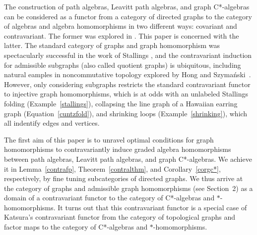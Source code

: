 \documentclass[12pt,times,a4paper]{amsart}
\numberwithin{equation}{section}
\numberwithin{equation}{section}
\begin{document}
The construction of path algebras, Leavitt path algebras, and graph C*-algebras can be considered as a functor from a category of 
directed graphs to the category of algebras and algebra homomorphisms in two different ways: covariant and contravariant. The former was explored in
\cite{kr-g09,j-s02,amp07,ht23}. This paper is concerned with the latter. 
The standard category of graphs and graph homomorphism was spectacularly successful in the work of Stallings \cite{s-jr83}, and the 
contravariant induction for admissible subgraphs (also called  quotient graphs)  is ubiquitous, including natural eamples in
 noncommutative topology explored by Hong and Szyma\'nski~\cite{hs02,hs08}. 
However, only considering subgraphs restricts  the standard contravariant functor to
injective graph homomorphisms, which is at odds with an unlabeled Stallings folding (Example~\ref{stallings}),
collapsing the line graph of a Hawaiian earring graph (Equation~\eqref{cuntzfold}), and
shrinking loops (Example~\ref{shrinking}), which all
indentify edges and vertices.

The first  aim of this paper is to unravel optimal conditions for graph homomorphisms to contravariantly induce
graded algebra homomorphisms between path algebras, Leavitt path algebras, and graph C*-algebras. We achieve it in
Lemma~\ref{contrafp}, Theorem~\ref{contralthm}, and Corollary~\ref{corgc*}, respectively, by fine tuning subcategories
of directed graphs. We thus arrive at the category of graphs and admissible graph homomorphisms (see Section~2) as a domain
of a contravariant functor to the category of C*-algebras and $*$-homomorphisms. It turns out that this contravariant functor
is a special case of Katsura's contravariant functor 
from the category of topological graphs and factor maps
to the category of C*-algebras and $*$-homomorphisms.
\end{document}
